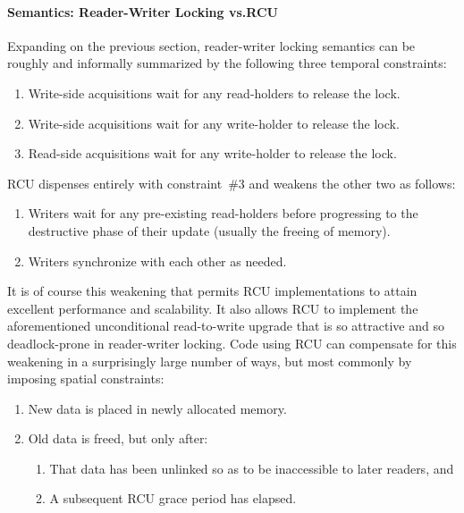 \paragraph{Semantics:
		      Reader-Writer Locking vs.\@ RCU}

Expanding on the previous section, reader-writer locking semantics can
be roughly and informally summarized by the following three temporal
constraints:

\begin{enumerate}
\item	Write-side acquisitions wait for any read-holders to release
	the lock.
\item	Write-side acquisitions wait for any write-holder to release
	the lock.
\item	Read-side acquisitions wait for any write-holder to release
	the lock.
\end{enumerate}

RCU dispenses entirely with constraint~\#3 and weakens the other two
as follows:

\begin{enumerate}
\item	Writers wait for any pre-existing read-holders before progressing
	to the destructive phase of their update (usually the freeing of
	memory).
\item	Writers synchronize with each other as needed.
\end{enumerate}

It is of course this weakening that permits RCU implementations to attain
excellent performance and scalability.
It also allows RCU to implement the aforementioned unconditional
read-to-write upgrade that is so attractive and so deadlock-prone in
reader-writer locking.
Code using RCU can compensate for this weakening in a surprisingly large
number of ways, but most commonly by imposing spatial constraints:

\begin{enumerate}
\item	New data is placed in newly allocated memory.
\item	Old data is freed, but only after:
	\begin{enumerate}
	\item	That data has been unlinked so as to be inaccessible
		to later readers, and
	\item	A subsequent RCU grace period has elapsed.
	\end{enumerate}
\end{enumerate}

